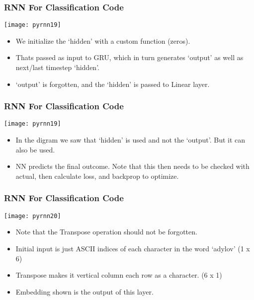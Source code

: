 \begin{frame}[fragile] \frametitle{RNN For Classification Code}
\begin{center}
\texttt{[image: pyrnn19]}
\end{center}
\begin{itemize}
\item We initialize the `hidden' with a custom function (zeros).
\item Thats passed as input to GRU, which in turn generates `output' as well as next/last timestep `hidden'.
\item `output' is forgotten, and the `hidden' is passed to Linear layer. 

\end{itemize}
\end{frame}

\begin{frame}[fragile] \frametitle{RNN For Classification Code}
\begin{center}
\texttt{[image: pyrnn19]}
\end{center}
\begin{itemize}
\item In the digram we saw that `hidden' is used and not the `output'. But it can also be used.
\item NN predicts the final outcome. Note that this then needs to be checked with actual, then calculate loss, and backprop to optimize.
\end{itemize}
\end{frame}

\begin{frame}[fragile] \frametitle{RNN For Classification Code}
\begin{center}
\texttt{[image: pyrnn20]}
\end{center}
\begin{itemize}
\item Note that the Transpose operation should not be forgotten.
\item Initial input is just ASCII indices of each character in the word `adylov' (1 x 6)
\item Transpose makes it vertical column each row as a character. (6 x 1)
\item Embedding shown is the output of this layer.
\end{itemize}
\end{frame}



